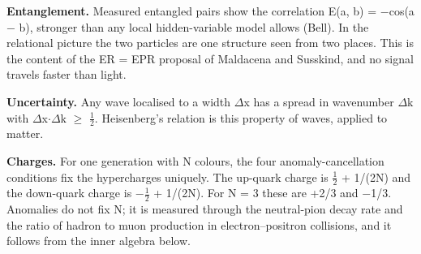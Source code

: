 \documentclass[
  11pt,
]{article}
\begin{document}
\textbf{Entanglement.} Measured entangled pairs show the correlation E(a, b) = \ensuremath{-}cos(a \ensuremath{-} b), stronger than any local hidden-variable model allows (Bell). In the relational picture the two particles are one structure seen from two places. This is the content of the ER = EPR proposal of Maldacena and Susskind, and no signal travels faster than light.

\textbf{Uncertainty.} Any wave localised to a width \ensuremath{\Delta}x has a spread in wavenumber \ensuremath{\Delta}k with \ensuremath{\Delta}x\ensuremath{\cdot}\ensuremath{\Delta}k \ensuremath{\ge} \ensuremath{\frac{1}{2}}. Heisenberg's relation is this property of waves, applied to matter.

\textbf{Charges.} For one generation with N colours, the four anomaly-cancellation conditions fix the hypercharges uniquely. The up-quark charge is \ensuremath{\frac{1}{2}} + 1/(2N) and the down-quark charge is \ensuremath{-}\ensuremath{\frac{1}{2}} + 1/(2N). For N = 3 these are +2/3 and \ensuremath{-}1/3. Anomalies do not fix N; it is measured through the neutral-pion decay rate and the ratio of hadron to muon production in electron--positron collisions, and it follows from the inner algebra below.
\end{document}
